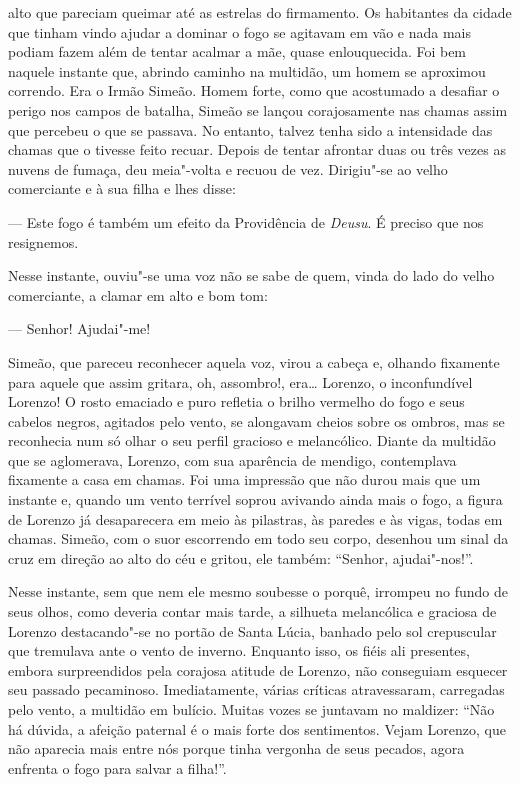 alto que pareciam queimar até as estrelas do firmamento. Os habitantes
da cidade que tinham vindo ajudar a dominar o fogo se agitavam em vão e
nada mais podiam fazem além de tentar acalmar a mãe, quase
enlouquecida. Foi bem naquele instante que, abrindo caminho na
multidão, um homem se aproximou correndo. Era o Irmão Simeão. Homem
forte, como que acostumado a desafiar o perigo nos campos de batalha,
Simeão se lançou corajosamente nas chamas assim que percebeu o que se
passava. No entanto, talvez tenha sido a intensidade das chamas que o
tivesse feito recuar. Depois de tentar afrontar duas ou três vezes as
nuvens de fumaça, deu meia"-volta e recuou de vez. Dirigiu"-se ao velho
comerciante e à sua filha e lhes disse:

--- Este fogo é também um efeito da Providência de \textit{Deusu}. É
preciso que nos resignemos.

Nesse instante, ouviu"-se uma voz não se sabe de quem, vinda do lado do
velho comerciante, a clamar em alto e bom tom:

--- Senhor! Ajudai"-me!

Simeão, que pareceu reconhecer aquela voz, virou a cabeça e, olhando
fixamente para aquele que assim gritara, oh, assombro!, era\ldots{} Lorenzo,
o inconfundível Lorenzo! O rosto emaciado e puro refletia o brilho
vermelho do fogo e seus cabelos negros, agitados pelo vento, se
alongavam cheios sobre os ombros, mas se reconhecia num só olhar o seu
perfil gracioso e melancólico. Diante da multidão que se aglomerava,
Lorenzo, com sua aparência de mendigo, contemplava fixamente a casa em
chamas. Foi uma impressão que não durou mais que um instante e, quando
um vento terrível soprou avivando ainda mais o fogo, a figura de
Lorenzo já desaparecera em meio às pilastras, às paredes e às vigas,
todas em chamas. Simeão, com o suor escorrendo em todo seu corpo,
desenhou um sinal da cruz em direção ao alto do céu e gritou, ele
também: ``Senhor, ajudai"-nos!''.

Nesse instante, sem que nem ele mesmo soubesse o porquê, irrompeu no
fundo de seus olhos, como deveria contar mais tarde, a silhueta
melancólica e graciosa de Lorenzo destacando"-se no portão de Santa
Lúcia, banhado pelo sol crepuscular que tremulava ante o vento de
inverno. Enquanto isso, os fiéis ali presentes, embora surpreendidos
pela corajosa atitude de Lorenzo, não conseguiam esquecer seu passado
pecaminoso. Imediatamente, várias críticas atravessaram, carregadas
pelo vento, a multidão em bulício. Muitas vozes se juntavam no
maldizer: ``Não há dúvida, a afeição paternal é o mais forte dos
sentimentos. Vejam Lorenzo, que não aparecia mais entre nós porque
tinha vergonha de seus pecados, agora enfrenta o fogo para salvar a filha!''.

